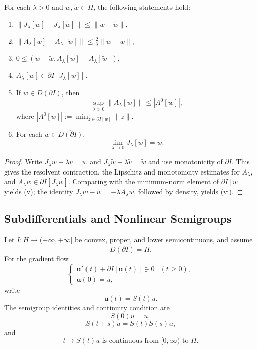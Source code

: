 \begin{theorem}
\label{thm:properties-resolvent-yosida}

For each $\lambda > 0$ and $w, \tilde{w} \in H$, the following statements hold:
\begin{enumerate}
\item[(i)] $\|J_\lambda[w] - J_\lambda[\tilde{w}]\| \le \|w - \tilde{w}\|$,
\item[(ii)] $\|A_\lambda[w] - A_\lambda[\tilde{w}]\| \le \frac{2}{\lambda}\|w - \tilde{w}\|$,
\item[(iii)] $0 \le (w - \tilde{w}, A_\lambda[w] - A_\lambda[\tilde{w}])$,
\item[(iv)] $A_\lambda[w] \in \partial I[J_\lambda[w]]$.
\item[(v)] If $w \in D(\partial I)$, then
\[
\sup_{\lambda > 0} \|A_\lambda[w]\| \le |A^0[w]|,
\]
where $|A^0[w]| := \min_{z \in \partial I[w]} \|z\|$.
\item[(vi)] For each $w \in \overline{D(\partial I)}$,
\[
\lim_{\lambda \to 0} J_\lambda[w] = w.
\]
\end{enumerate}
\end{theorem}

\begin{proof}
\sketch Write $J_\lambda w+\lambda v=w$ and $J_\lambda\tilde w+\lambda\tilde v=\tilde w$ and use monotonicity of $\partial I$. This gives the resolvent contraction, the Lipschitz and monotonicity estimates for $A_\lambda$, and $A_\lambda w\in\partial I[J_\lambda w]$. Comparing with the minimum-norm element of $\partial I[w]$ yields (v); the identity $J_\lambda w-w=-\lambda A_\lambda w$, followed by density, yields (vi).
\end{proof}

\subsection{Subdifferentials and Nonlinear Semigroups}
\label{sec:subdifferentials-nonlinear-semigroups}

Let $I:H\to(-\infty,+\infty]$ be convex, proper, and lower semicontinuous, and assume
\[
\overline{D(\partial I)}=H.
\tag{8}
\]
For the gradient flow
\[
\begin{cases}
\mathbf u'(t)+\partial I[\mathbf u(t)]\ni0 & (t\geq0),\\
\mathbf u(0)=u,
\end{cases}
\tag{9}
\]
write
\[
\mathbf u(t)=S(t)u.
\tag{10}
\]
The semigroup identities and continuity condition are
\[
S(0)u=u,
\tag{11}
\]
\[
S(t+s)u=S(t)S(s)u,
\tag{12}
\]
and
\[
t\longmapsto S(t)u\text{ is continuous from }[0,\infty)\text{ to }H.
\tag{13}
\]

